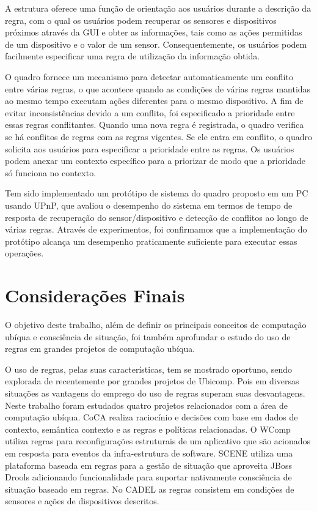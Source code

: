 \documentclass[12pt,a4paper,compsoc]{IEEEtran}
\begin{document}
  A estrutura oferece uma função de orientação aos usuários durante a descrição da regra, com o qual
  os usuários podem recuperar os sensores e dispositivos próximos através da GUI e obter as 
  informações, tais como as ações permitidas de um dispositivo e o valor de um sensor. 
  Consequentemente, os usuários podem facilmente especificar uma regra de utilização da informação
  obtida.
  
  O quadro fornece um mecanismo para detectar automaticamente um conflito entre várias regras, o que
  acontece quando as condições de várias regras mantidas ao mesmo tempo executam ações diferentes para
  o mesmo dispositivo. A fim de evitar inconsistências devido a um conflito, foi especificado a
  prioridade entre essas regras conflitantes. Quando uma nova regra é registrada, o quadro verifica se
  há conflitos de regras com as regras vigentes. Se ele entra em conflito, o quadro solicita aos 
  usuários para especificar a prioridade entre as regras. Os usuários podem anexar um contexto 
  específico para a priorizar de modo que a prioridade só funciona no contexto.
  
  Tem sido implementado um protótipo de sistema do quadro proposto em um PC usando UPnP, que
  avaliou o desempenho do sistema em termos de tempo de resposta de recuperação do
  sensor/dispositivo e detecção de conflitos ao longo de várias regras. Através de experimentos,
  foi confirmamos que a implementação do protótipo alcança um desempenho praticamente suficiente
  para executar essas operações.


\section{Considerações Finais}

  O objetivo deste trabalho, além de definir os principais conceitos de computação ubíqua e 
  consciência de situação, foi também aprofundar o estudo do uso de regras em grandes projetos de
  computação ubíqua.
  
  O uso de regras, pelas suas características, tem se mostrado oportuno, sendo explorada de 
  recentemente por grandes projetos de Ubicomp. Pois em diversas situações as vantagens do emprego
  do uso de regras superam suas desvantagens. Neste trabalho foram estudados quatro projetos
  relacionados com a área de computação ubíqua. CoCA realiza raciocínio e decisões com base em 
  dados de contexto, semântica contexto e as regras e políticas relacionadas. O WComp utiliza
  regras para reconfigurações estruturais de um aplicativo que são acionados em resposta para
  eventos da infra-estrutura de software. SCENE utiliza uma plataforma baseada em regras para a
  gestão de situação que aproveita JBoss Drools adicionando funcionalidade para suportar 
  nativamente consciência de situação baseado em regras. No CADEL as regras consistem em condições
  de sensores e ações de dispositivos descritos.
\end{document}
